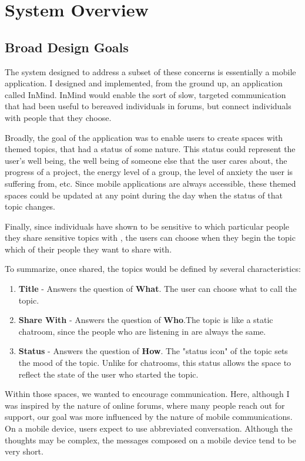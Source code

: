 \chapter{System Overview}
  \section{Broad Design Goals}
  The system designed to address a subset of these concerns is essentially a mobile application.
  I designed and implemented,
  from the ground up, an application called InMind.
  InMind would enable the sort of slow,
  targeted communication that had been useful to bereaved individuals in forums,
  but connect individuals with people that they choose.

  Broadly, the goal of the application was to enable users to create spaces
  with themed topics, that had a status of some nature.
  This status could represent the user's well being, the well being of someone else
  that the user cares about, the progress of a project, the energy level of a group,
  the level of anxiety the user is suffering from, etc.
  Since mobile applications are always accessible,
  these themed spaces could be updated at any point
  during the day when the status of that topic changes.

  Finally, since individuals have shown to be sensitive
  to which particular people they share
  sensitive topics with \cite{},
  the users can choose when they begin the topic
  which of their people they want to share with.

  To summarize, once shared, the topics would be defined by several characteristics:

  \begin{enumerate}
  \item \textbf{Title} - Answers the question of \textbf{What}. The user can choose what to call the topic.
  \item \textbf{Share With} - Answers the question of \textbf{Who}.The topic is like a static chatroom,
    since the people who are listening in are always the same.
  \item \textbf{Status} - Answers the question of \textbf{How}. The "status icon" of the topic sets the mood
    of the topic. Unlike for chatrooms,
    this status allows the space to reflect the state
    of the user who started the topic.
  \end{enumerate}

  Within those spaces, we wanted to encourage communication.
  Here, although I was inspired by the nature of online forums,
  where many people reach out for support,
  our goal was more influenced by the nature of mobile communications.
  On a mobile device, users expect to use abbreviated conversation.
  Although the thoughts may be complex, the messages composed on a mobile device
  tend to be very short.

